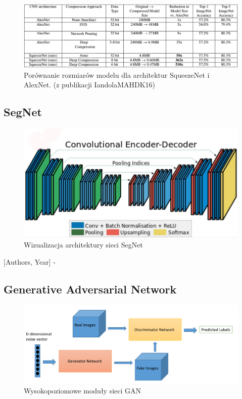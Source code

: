 \documentclass[12pt,a4paper,twoside,titlepage,openright]{book}
\begin{document}
\begin{figure}[ht]
	\centering
			\includegraphics[resolution=100, scale=0.55]{squeezeNetCompression.png}
		\caption{Porównanie rozmiarów modelu dla architektur SqueezeNet i AlexNet. (z publikacji IandolaMAHDK16)}
\end{figure}

\subsection{SegNet}
\begin{figure}[ht]
	\centering
			\includegraphics[resolution=100, scale=0.4]{SegNet.png}
		\caption{Wizualizacja architektury sieci SegNet}
\end{figure}
[Authors, Year] - \cite{DBLP:journals/corr/BadrinarayananH15}

\subsection{Generative Adversarial Network}
\begin{figure}[ht]
	\centering
			\includegraphics[resolution=100,scale=0.36]{GAN.png}
		\caption{Wysokopoziomowe moduły sieci GAN}
\end{figure}
\end{document}
